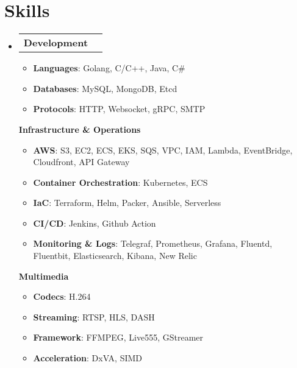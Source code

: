 \documentclass[letterpaper,11pt]{article}
\makeatletter
\newcommand{\resumeItem}[1]{
  \item\small{
    {#1 \vspace{-2pt}}
  }
}
\newcommand{\resumeProjectHeading}[1]{
    \item
    \begin{tabular*}{1.001\textwidth}{l@{\extracolsep{\fill}}r}
      \small#1 \\
    \end{tabular*}\vspace{-7pt}
}
\newcommand{\resumeSubHeadingListStart}{\begin{itemize}[leftmargin=0.0in, label={}]}
\newcommand{\resumeSubHeadingListEnd}{\end{itemize}}
\newcommand{\resumeItemListStart}{\begin{itemize}}
\newcommand{\resumeItemListEnd}{\end{itemize}}
\makeatother
\begin{document}
\section{Skills}
    \vspace{-5pt}
    \resumeSubHeadingListStart
        \resumeProjectHeading
          {\textbf{Development}}
          \resumeItemListStart
            \resumeItem{\textbf{Languages}{: Golang, C/C++, Java, C\#}}
            \resumeItem{\textbf{Databases}{: MySQL, MongoDB, Etcd}}
            \resumeItem{\textbf{Protocols}{: HTTP, Websocket, gRPC, SMTP}}
          \resumeItemListEnd
          {\textbf{Infrastructure \& Operations}}
          \vspace{-8pt}
          \resumeItemListStart
            \resumeItem{\textbf{AWS}{: S3, EC2, ECS, EKS, SQS, VPC, IAM, Lambda, EventBridge, Cloudfront, API Gateway}}
            \resumeItem{\textbf{Container Orchestration}{: Kubernetes, ECS}}
            \resumeItem{\textbf{IaC}{: Terraform, Helm, Packer, Ansible, Serverless}}
            \resumeItem{\textbf{CI/CD}{: Jenkins, Github Action}}
            \resumeItem{\textbf{Monitoring \& Logs}{: Telegraf, Prometheus, Grafana, Fluentd, Fluentbit, Elasticsearch, Kibana, New Relic}}
          \resumeItemListEnd
          {\textbf{Multimedia}}
          \vspace{-8pt}
          \resumeItemListStart
            \resumeItem{\textbf{Codecs}{: H.264}}
            \resumeItem{\textbf{Streaming}{: RTSP, HLS, DASH}}
            \resumeItem{\textbf{Framework}{: FFMPEG, Live555, GStreamer}}
            \resumeItem{\textbf{Acceleration}{: DxVA, SIMD}}
          \resumeItemListEnd
    \resumeSubHeadingListEnd

\vspace{-10pt}
\end{document}
